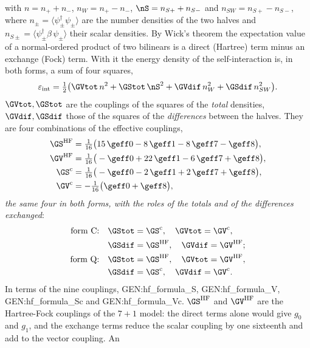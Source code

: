 with $n=n_++n_-$, $n_W=n_+-n_-$, $\nS=n_{S+}+n_{S-}$ and $n_{SW}=n_{S+}-n_{S-}$, where
$n_\pm=\langle\psi_\pm^\dagger\psi_\pm\rangle$ are the number densities of the two halves and
$n_{S\pm}=\langle\psi_\pm^\dagger\beta\,\psi_\pm\rangle$ their scalar densities. By Wick's theorem
the expectation value of a normal-ordered product of two bilinears is a direct (Hartree) term minus
an exchange (Fock) term. With it the energy density of the self-interaction is, in both forms, a sum
of four squares,
\begin{equation}
\varepsilon_{\mathrm{int}}=\tfrac12\big(\GVtot\,n^{2}+\GStot\,\nS^{2}+\GVdif\,n_W^{2}+\GSdif\,n_{SW}^{2}\big).
\label{eq:EHF}
\end{equation}
$\GVtot,\GStot$ are the couplings of the squares of the \emph{total} densities, $\GVdif,\GSdif$
those of the squares of the \emph{differences} between the halves. They are four combinations of the
effective couplings,
\begin{equation}
\begin{aligned}
\GS^{\mathrm{HF}}&=\tfrac1{16}\big(15\,\geff0-8\,\geff1-8\,\geff7-\geff8\big),\\
\GV^{\mathrm{HF}}&=\tfrac1{16}\big(-\geff0+22\,\geff1-6\,\geff7+\geff8\big),\\
\GS^{\mathrm c}&=\tfrac1{16}\big(-\geff0-2\,\geff1+2\,\geff7+\geff8\big),\\
\GV^{\mathrm c}&=-\tfrac1{16}\big(\geff0+\geff8\big),
\end{aligned}
\label{eq:GHF}
\end{equation}
\emph{the same four in both forms, with the roles of the totals and of the differences exchanged}:
\begin{equation}
\begin{aligned}
\text{form C:}\quad&\GStot=\GS^{\mathrm c},\quad\GVtot=\GV^{\mathrm c},\\
&\GSdif=\GS^{\mathrm{HF}},\quad\GVdif=\GV^{\mathrm{HF}};\\
\text{form Q:}\quad&\GStot=\GS^{\mathrm{HF}},\quad\GVtot=\GV^{\mathrm{HF}},\\
&\GSdif=\GS^{\mathrm c},\quad\GVdif=\GV^{\mathrm c}.
\end{aligned}
\label{eq:roles}
\end{equation}
In terms of the nine couplings, {{GEN:hf_formula_S}}, {{GEN:hf_formula_V}},
{{GEN:hf_formula_Sc}} and {{GEN:hf_formula_Vc}}. $\GS^{\mathrm{HF}}$ and $\GV^{\mathrm{HF}}$ are the
Hartree-Fock couplings of the $7+1$ model: the direct terms alone would give $g_0$ and $g_1$, and
the exchange terms reduce the scalar coupling by one sixteenth and add to the vector coupling. An
